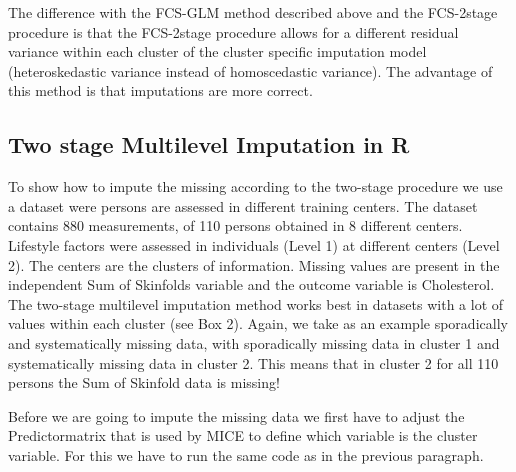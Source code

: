 \documentclass[]{book}
\newenvironment{Shaded}{\begin{snugshade}}{\end{snugshade}}
\newcommand{\KeywordTok}[1]{\textcolor[rgb]{0.13,0.29,0.53}{\textbf{#1}}}
\newcommand{\DataTypeTok}[1]{\textcolor[rgb]{0.13,0.29,0.53}{#1}}
\newcommand{\DecValTok}[1]{\textcolor[rgb]{0.00,0.00,0.81}{#1}}
\newcommand{\StringTok}[1]{\textcolor[rgb]{0.31,0.60,0.02}{#1}}
\newcommand{\CommentTok}[1]{\textcolor[rgb]{0.56,0.35,0.01}{\textit{#1}}}
\newcommand{\OperatorTok}[1]{\textcolor[rgb]{0.81,0.36,0.00}{\textbf{#1}}}
\newcommand{\NormalTok}[1]{#1}
\theoremstyle{definition}
\theoremstyle{definition}
\theoremstyle{definition}
\theoremstyle{remark}
\begin{document}
The difference with the FCS-GLM method described above and the
FCS-2stage procedure is that the FCS-2stage procedure allows for a
different residual variance within each cluster of the cluster specific
imputation model (heteroskedastic variance instead of homoscedastic
variance). The advantage of this method is that imputations are more
correct.

\subsection{Two stage Multilevel Imputation in
R}\label{two-stage-multilevel-imputation-in-r}

To show how to impute the missing according to the two-stage procedure
we use a dataset were persons are assessed in different training
centers. The dataset contains 880 measurements, of 110 persons obtained
in 8 different centers. Lifestyle factors were assessed in individuals
(Level 1) at different centers (Level 2). The centers are the clusters
of information. Missing values are present in the independent Sum of
Skinfolds variable and the outcome variable is Cholesterol. The
two-stage multilevel imputation method works best in datasets with a lot
of values within each cluster (see Box 2). Again, we take as an example
sporadically and systematically missing data, with sporadically missing
data in cluster 1 and systematically missing data in cluster 2. This
means that in cluster 2 for all 110 persons the Sum of Skinfold data is
missing!

Before we are going to impute the missing data we first have to adjust
the Predictormatrix that is used by MICE to define which variable is the
cluster variable. For this we have to run the same code as in the
previous paragraph.

\begin{Shaded}
\end{Shaded}
\end{document}
